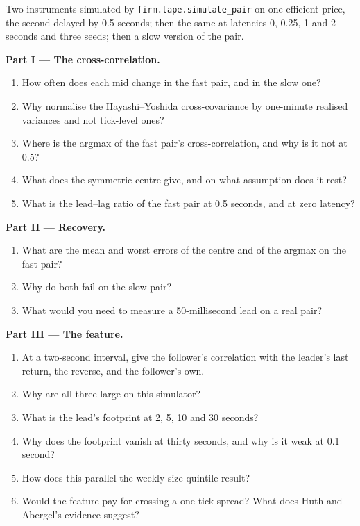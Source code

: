 \begin{problem}\label{pb:rs:cross-sectional-and-cross-asset-features:1}
Two instruments simulated by \texttt{firm.tape.simulate\_pair} on one efficient price, the second delayed by 0.5 seconds; then the
same at latencies 0, 0.25, 1 and 2 seconds and three seeds; then a slow version of the pair.

\medskip\noindent\textbf{Part I --- The cross-correlation.}
\begin{enumerate}
\item How often does each mid change in the fast pair, and in the slow one?
\item Why normalise the Hayashi--Yoshida cross-covariance by one-minute realised variances and not tick-level ones?
\item Where is the argmax of the fast pair's cross-correlation, and why is it not at 0.5?
\item What does the symmetric centre give, and on what assumption does it rest?
\item What is the lead--lag ratio of the fast pair at 0.5 seconds, and at zero latency?
\end{enumerate}

\medskip\noindent\textbf{Part II --- Recovery.}
\begin{enumerate}[resume]
\item What are the mean and worst errors of the centre and of the argmax on the fast pair?
\item Why do both fail on the slow pair?
\item What would you need to measure a 50-millisecond lead on a real pair?
\end{enumerate}

\medskip\noindent\textbf{Part III --- The feature.}
\begin{enumerate}[resume]
\item At a two-second interval, give the follower's correlation with the leader's last return, the reverse, and the follower's own.
\item Why are all three large on this simulator?
\item What is the lead's footprint at 2, 5, 10 and 30 seconds?
\item Why does the footprint vanish at thirty seconds, and why is it weak at 0.1 second?
\item How does this parallel the weekly size-quintile result?
\item Would the feature pay for crossing a one-tick spread? What does Huth and Abergel's evidence suggest?
\end{enumerate}


\end{problem}
